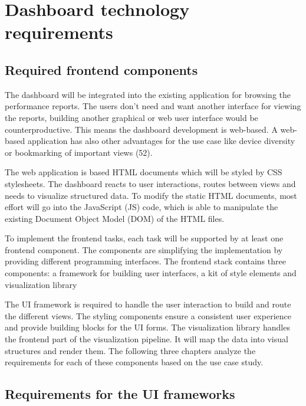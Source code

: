 \documentclass[american,a4paper,oneside,,tablecaptionabove]{scrbook}
\begin{document}
\section{Dashboard technology
requirements}\label{dashboard-technology-requirements}

\subsection{Required frontend components}\label{sec:frontend-req}

The dashboard will be integrated into the existing application for
browsing the performance reports. The users don't need and want another
interface for viewing the reports, building another graphical or web
user interface would be counterproductive. This means the dashboard
development is web-based. A web-based application has also other
advantages for the use case like device diversity or bookmarking of
important views (52).

The web application is based HTML documents which will be styled by CSS
stylesheets. The dashboard reacts to user interactions, routes between
views and needs to visualize structured data. To modify the static HTML
documents, most effort will go into the JavaScript (JS) code, which is
able to manipulate the existing Document Object Model (DOM) of the HTML
files.

To implement the frontend tasks, each task will be supported by at least
one frontend component. The components are simplifying the
implementation by providing different programming interfaces. The
frontend stack contains three components: a framework for building user
interfaces, a kit of style elements and visualization library

The UI framework is required to handle the user interaction to build and
route the different views. The styling components ensure a consistent
user experience and provide building blocks for the UI forms. The
visualization library handles the frontend part of the visualization
pipeline. It will map the data into visual structures and render them.
The following three chapters analyze the requirements for each of these
components based on the use case study.

\subsection{Requirements for the UI frameworks}\label{sec:uilib-req}
\end{document}
